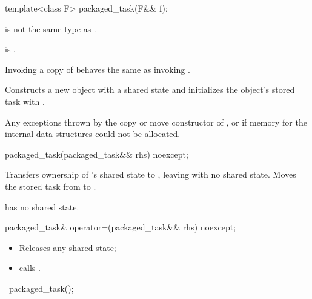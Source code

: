 %
\begin{itemdecl}
template<class F>
  packaged_task(F&& f);
\end{itemdecl}

\begin{itemdescr}
\pnum
\constraints
{}
is not the same type as .

\pnum
\mandates
{} is .

\pnum
\expects
Invoking a copy of  behaves the same as invoking .

\pnum
\effects
Constructs a new  object with a shared state and
initializes the object's stored task with .

\pnum
\throws
Any exceptions thrown by the copy or move constructor of , or
 if memory for the internal data structures
could not be allocated.
\end{itemdescr}

%
\begin{itemdecl}
packaged_task(packaged_task&& rhs) noexcept;
\end{itemdecl}

\begin{itemdescr}
\pnum
\effects
Transfers ownership of
's shared state to , leaving  with no
shared state. Moves the stored task from  to .

\pnum
\ensures
{} has no shared state.
\end{itemdescr}

%
\begin{itemdecl}
packaged_task& operator=(packaged_task&& rhs) noexcept;
\end{itemdecl}

\begin{itemdescr}
\pnum
\effects
\begin{itemize}
\item
Releases any shared state;
\item
calls .
\end{itemize}
\end{itemdescr}

%
\begin{itemdecl}
~packaged_task();
\end{itemdecl}

